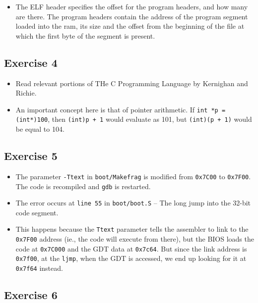 \documentclass[]{article}
\begin{document}
\begin{itemize}
\itemsep1pt\parskip0pt
\item
  The ELF header specifies the offset for the program headers, and how
  many are there. The program headers contain the address of the program
  segment loaded into the ram, its size and the offset from the
  beginning of the file at which the first byte of the segment is
  present.
\end{itemize}

\subsection{Exercise 4}

\begin{itemize}
\itemsep1pt\parskip0pt
\item
  Read relevant portions of THe C Programming Language by Kernighan and
  Richie.
\item
  An important concept here is that of pointer arithmetic. If
  \texttt{int *p = (int*)100}, then \texttt{(int)p + 1} would evaluate
  as 101, but \texttt{(int)(p + 1)} would be equal to 104.
\end{itemize}

\subsection{Exercise 5}

\begin{itemize}
\itemsep1pt\parskip0pt
\item
  The parameter \texttt{-Ttext} in \texttt{boot/Makefrag} is modified
  from \texttt{0x7C00} to \texttt{0x7F00}. The code is recompiled and
  \texttt{gdb} is restarted.
\item
  The error occurs at \texttt{line 55} in \texttt{boot/boot.S} -- The
  long jump into the 32-bit code segment.
\item
  This happens because the \texttt{Ttext} parameter tells the assembler
  to link to the \texttt{0x7F00} address (ie., the code will execute
  from there), but the BIOS loads the code at \texttt{0x7C000} and the
  GDT data at \texttt{0x7c64}. But since the link address is
  \texttt{0x7f00}, at the \texttt{ljmp}, when the GDT is accessed, we
  end up looking for it at \texttt{0x7f64} instead.
\end{itemize}

\subsection{Exercise 6}
\end{document}
